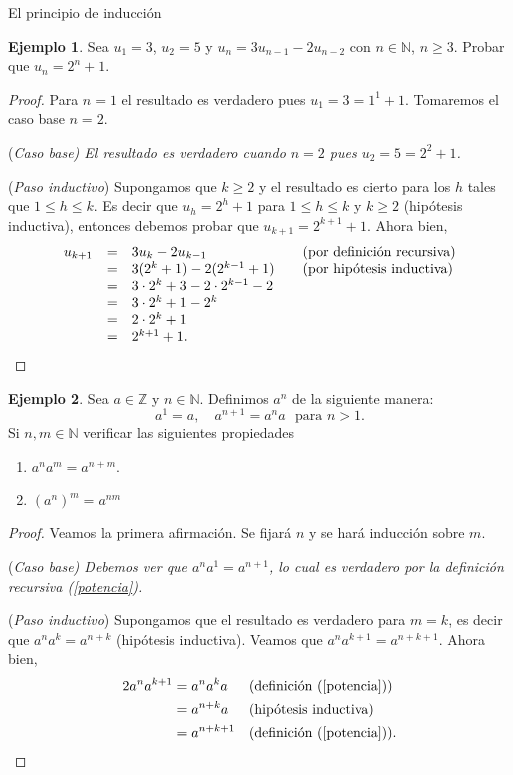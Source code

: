 \documentclass[11pt,spanish,makeidx]{amsbook}
\theoremstyle{definition}
\newtheorem{ejemplo}{Ejemplo}[section]
\theoremstyle{remark}
\begin{document}
\begin{section}{El principio de inducción}
\begin{ejemplo}
Sea $u_1 = 3$, $u_2 = 5$ y $u_n = 3u_{n-1}  - 2u_{n-2}$ con $n \in  \mathbb N$, $n \ge 3$. Probar que $u_n = 2^n + 1$.
\begin{proof} Para $n=1$ el resultado es verdadero pues $u_1 =3 = 1^1 +1$. Tomaremos el caso  base $n=2$.

\noindent(\it Caso  base\rm) El resultado es verdadero cuando  $n=2$ pues $u_2 = 5 =2^2+1$.

\noindent ({\it Paso  inductivo}) Supongamos que $k \ge 2$ y el resultado  es cierto para los $h$ tales que  $1 \le h \le k$. Es decir que $u_h = 2^h+1$ para $1 \le h \le k$ y $k \ge 2$ (hipótesis inductiva), entonces debemos probar que $u_{k+1} = 2^{k+1}+1$. Ahora bien, 
$$
\begin{matrix} u_{k+1} &=& 3u_k -2u_{k-1} \hfill &\quad \text{(por definición recursiva)} \hfill \\
&=& 3(2^k+1)-2(2^{k-1}+1) \hfill &\quad \text{(por hipótesis inductiva})\hfill \\
&=& 3\cdot 2^k+3-2\cdot 2^{k-1}-2 \hfill & \\
&=& 3\cdot 2^k+1- 2^{k} \hfill & \\
&=& 2\cdot 2^k+1 \hfill & \\
&=& 2^{k+1}+1. \hfill & 
\end{matrix}
$$
\end{proof}
\end{ejemplo}

\begin{ejemplo}
Sea $a \in \mathbb Z$ y $n \in \mathbb N$. Definimos $a^n$ de la siguiente manera:
\begin{equation}\label{potencia}
a^1 = a, \quad a^{n+1} = a^{n}a \,\,\text{ para $n >1$.}
\end{equation}
Si $n,m \in \mathbb N$ verificar las siguientes propiedades
\begin{enumerate}
\item \label{pot+pot}$a^{n}a^m = a^{n+m}$.
\item \label{potpot}$(a^n)^m = a^{nm}$
\end{enumerate}
\begin{proof}
Veamos la primera afirmación. Se fijará $n$ y se hará inducción sobre $m$. 

\noindent(\it Caso  base\rm) Debemos ver que $a^{n}a^1 = a^{n+1}$, lo cual es verdadero por la definición recursiva (\ref{potencia}). 

\noindent ({\it Paso  inductivo}) Supongamos que el resultado es verdadero para $m=k$, es decir que $a^{n}a^k = a^{n+k}$ (hipótesis inductiva). Veamos que  $a^{n}a^{k+1} = a^{n+k+1}$. Ahora bien, 
\begin{alignat*}2
a^{n}a^{k+1} &= a^{n}a^{k}a&  & \text{(definición (\ref{potencia}))} \\
&= a^{n+k}a& & \text{(hipótesis inductiva)} \\
&= a^{n+k+1}&  & \text{(definición (\ref{potencia}))}. 
\end{alignat*}


\end{proof}
\end{ejemplo}
\end{section}
\end{document}
